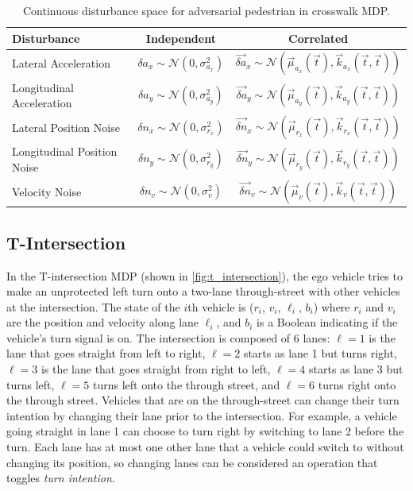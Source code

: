 \begin{table}
    \centering
    \caption{Continuous disturbance space for adversarial pedestrian in crosswalk MDP.}
    \label{tab:adversarial_ped_disturbance_space}
    \begin{tabular}{@{}lcc@{}} 
        \toprule
        \textbf{Disturbance} & \textbf{Independent} & \textbf{Correlated} \\
        \midrule
        Lateral Acceleration &  $\delta a_x \sim \mathcal{N}(0, \sigma_{a_x}^2)$ &  $\vec{\delta a}_x \sim \mathcal{N}(\vec{\mu}_{a_x}(\vec{t}), \vec{k}_{a_x}(\vec{t}, \vec{t}))$ \\
        Longitudinal Acceleration &  $ \delta a_y \sim \mathcal{N}(0, \sigma_{a_y}^2)$ &  $\vec{\delta a}_y \sim \mathcal{N}(\vec{\mu}_{a_y}(\vec{t}), \vec{k}_{a_y}(\vec{t}, \vec{t}))$ \\
        Lateral Position Noise &  $\delta n_x \sim \mathcal{N}(0, \sigma_{r_x}^2)$ &  $\vec{\delta n}_x \sim \mathcal{N}(\vec{\mu}_{r_x}(\vec{t}), \vec{k}_{r_x}(\vec{t}, \vec{t}))$ \\
        Longitudinal Position Noise &  $\delta n_y \sim \mathcal{N}(0, \sigma_{r_y}^2)$ &  $\vec{\delta n}_y \sim \mathcal{N}(\vec{\mu}_{r_y}(\vec{t}), \vec{k}_{r_y}(\vec{t}, \vec{t}))$ \\
        Velocity Noise &  $\delta n_v \sim \mathcal{N}(0, \sigma_{v}^2)$ &  $\vec{\delta n}_{v} \sim \mathcal{N}(\vec{\mu}_{v}(\vec{t}), \vec{k}_{v}(\vec{t}, \vec{t}))$ \\
        \bottomrule
    \end{tabular}
\end{table}
 



\subsection{T-Intersection}

In the T-intersection MDP (shown in \cref{fig:t_intersection}), the ego vehicle tries to make an unprotected left turn onto a two-lane through-street with other vehicles at the intersection. The state of the $i$th vehicle is ($r_i$, $v_i$, $\ell_i$, $b_i$) where $r_i$ and $v_i$ are the position and velocity along lane $\ell_i$, and $b_i$ is a Boolean indicating if the vehicle's turn signal is on. The intersection is composed of \num{6} lanes: $\ell = 1$ is the lane that goes straight from left to right, $\ell = 2$ starts as lane \num{1} but turns right, $\ell = 3$ is the lane that goes straight from right to left, $\ell = 4$ starts as lane \num{3} but turns left, $\ell = 5$ turns left onto the through street, and $\ell = 6$ turns right onto the through street. Vehicles that are on the through-street can change their turn intention by changing their lane prior to the intersection. For example, a vehicle going straight in lane \num{1} can choose to turn right by switching to lane \num{2} before the turn. Each lane has at most one other lane that a vehicle could switch to without changing its position, so changing lanes can be considered an operation that toggles \emph{turn intention}.

